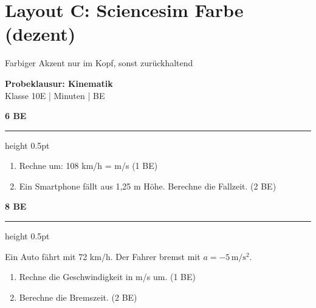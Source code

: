 \documentclass[11pt,a4paper]{article}
\begin{document}
\section*{Layout C: Sciencesim Farbe (dezent)}
\vspace{-0.3cm}
{\small Farbiger Akzent nur im Kopf, sonst zurückhaltend}

\vspace{0.5cm}

\begin{tcolorbox}[
    colback=physik!8,
    colframe=physik,
    boxrule=0.5pt,
    arc=0pt,
    left=5pt, right=5pt, top=5pt, bottom=5pt
]
\centering
{\Large\bfseries\color{physik} Probeklausur: Kinematik}\\[0.2cm]
{\small Klasse 10E \quad| Minuten \quad| BE}
\end{tcolorbox}

\vspace{0.5cm}

\noindent{\color{physik}\rule{0.3cm}{0.3cm}}\hspace{0.3cm}{\bfseries Aufgabe 1: Grundlagen}\hfill{\small\bfseries 6 BE}

\vspace{0.2cm}
{\color{border}\hrule height 0.5pt}
\vspace{0.3cm}

\begin{enumerate}
\item[a)] Rechne um: 108 km/h = \underline{\hspace{2cm}} m/s \hfill (1 BE)
\item[b)] Ein Smartphone fällt aus 1,25 m Höhe. Berechne die Fallzeit. \hfill (2 BE)
\end{enumerate}

\vspace{0.5cm}

\noindent{\color{physik}\rule{0.3cm}{0.3cm}}\hspace{0.3cm}{\bfseries Aufgabe 2: Gefahrenbremsung}\hfill{\small\bfseries 8 BE}

\vspace{0.2cm}
{\color{border}\hrule height 0.5pt}
\vspace{0.3cm}

Ein Auto fährt mit 72 km/h. Der Fahrer bremst mit $a = -5\,\mathrm{m/s^2}$.

\begin{enumerate}
\item[a)] Rechne die Geschwindigkeit in m/s um. \hfill (1 BE)
\item[b)] Berechne die Bremszeit. \hfill (2 BE)
\end{enumerate}
\end{document}
